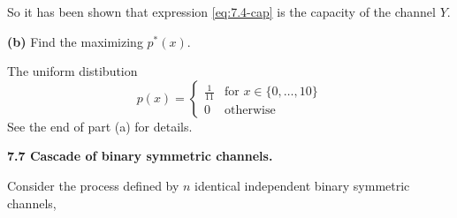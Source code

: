 \documentclass[10pt]{article}
\newcommand{\setbrace}[1]{{\{#1\}}}
\begin{document}
\begin{tiny}
\begin{multicols}{3}
So it has been shown that expression \ref{eq:7.4-cap} is the capacity of
the channel $Y$.

\textbf{(b)} Find the maximizing $p^*(x)$.

The uniform distibution
\begin{equation*}
    p(x)= \begin{cases}
        \frac{1}{11} & \text{for $x \in \setbrace{0,\dots,10}$} \\
        0 & \text{otherwise}
    \end{cases}
\end{equation*}
See the end of part (a) for details.

\textbf{\scriptsize 7.7 Cascade of binary symmetric channels.}

Consider the process defined by $n$ identical independent binary symmetric
channels,


\end{multicols}
\end{tiny}
\end{document}

